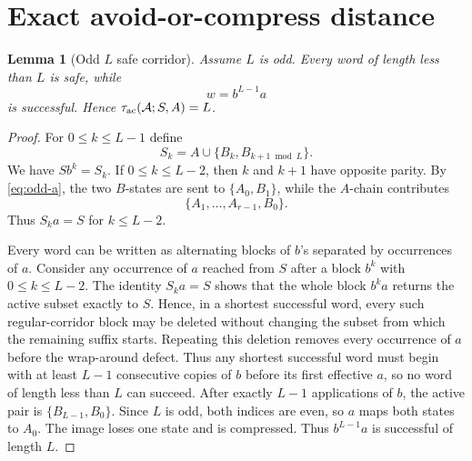 \documentclass[11pt]{article}
\newtheorem{lemma}{Lemma}
\theoremstyle{definition}
\theoremstyle{remark}
\newcommand{\Acal}{\mathcal A}
\newcommand{\tauac}{\tau_{\rm ac}}
\begin{document}
\section{Exact avoid-or-compress distance}
\begin{lemma}[Odd $L$ safe corridor]\label{lem:odd}
Assume $L$ is odd. Every word of length less than $L$ is safe, while
\[
w=b^{L-1}a
\]
is successful. Hence $\tauac(\Acal;S,A)=L$.
\end{lemma}
\begin{proof}
For $0\le k\le L-1$ define
\[
S_k=A\cup\{B_k,B_{k+1\bmod L}\}.
\]
We have $S b^k=S_k$. If $0\le k\le L-2$, then $k$ and $k+1$ have opposite parity. By \eqref{eq:odd-a}, the two $B$-states are sent to $\{A_0,B_1\}$, while the $A$-chain contributes
\[
\{A_1,\ldots,A_{r-1},B_0\}.
\]
Thus $S_k a=S$ for $k\le L-2$.

Every word can be written as alternating blocks of $b$'s separated by occurrences of $a$. Consider any occurrence of $a$ reached from $S$ after a block $b^k$ with $0\le k\le L-2$. The identity $S_k a=S$ shows that the whole block $b^k a$ returns the active subset exactly to $S$. Hence, in a shortest successful word, every such regular-corridor block may be deleted without changing the subset from which the remaining suffix starts. Repeating this deletion removes every occurrence of $a$ before the wrap-around defect. Thus any shortest successful word must begin with at least $L-1$ consecutive copies of $b$ before its first effective $a$, so no word of length less than $L$ can succeed. After exactly $L-1$ applications of $b$, the active pair is $\{B_{L-1},B_0\}$. Since $L$ is odd, both indices are even, so $a$ maps both states to $A_0$. The image loses one state and is compressed. Thus $b^{L-1}a$ is successful of length $L$.
\end{proof}
\end{document}
